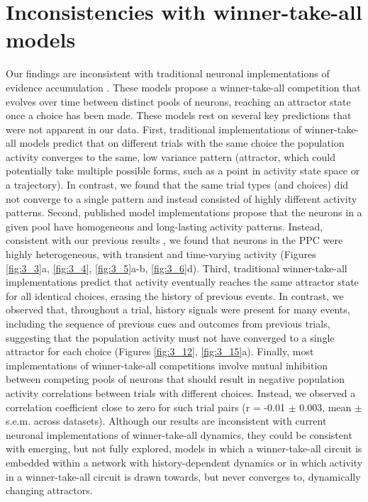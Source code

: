 \section{Inconsistencies with winner-take-all models} \label{discussion:wta}

Our findings are inconsistent with traditional neuronal implementations of evidence accumulation \citep{Wong:2006in, Machens:2005en, Wang:2002kn}. These models propose a winner-take-all competition that evolves over time between distinct pools of neurons, reaching an attractor state once a choice has been made. These models rest on several key predictions that were not apparent in our data. First, traditional implementations of winner-take-all models predict that on different trials with the same choice the population activity converges to the same, low variance pattern (attractor, which could potentially take multiple possible forms, such as a point in activity state space or a trajectory). In contrast, we found that the same trial types (and choices) did not converge to a single pattern and instead consisted of highly different activity patterns. Second, published model implementations propose that the neurons in a given pool have homogeneous and long-lasting activity patterns. Instead, consistent with our previous results \citep{Harvey:2012du}, we found that neurons in the PPC were highly heterogeneous, with transient and time-varying activity (Figures \ref{fig:3_3}a, \ref{fig:3_4}, \ref{fig:3_5}a-b, \ref{fig:3_6}d). Third, traditional winner-take-all implementations predict that activity eventually reaches the same attractor state for all identical choices, erasing the history of previous events. In contrast, we observed that, throughout a trial, history signals were present for many events, including the sequence of previous cues and outcomes from previous trials, suggesting that the population activity must not have converged to a single attractor for each choice (Figures \ref{fig:3_12}, \ref{fig:3_15}a). Finally, most implementations of winner-take-all competitions involve mutual inhibition between competing pools of neurons that should result in negative population activity correlations between trials with different choices. Instead, we observed a correlation coefficient close to zero for such trial pairs (r = -0.01 $\pm$ 0.003, mean $\pm$ s.e.m. across datasets). Although our results are inconsistent with current neuronal implementations of winner-take-all dynamics, they could be consistent with emerging, but not fully explored, models in which a winner-take-all circuit is embedded within a network with history-dependent dynamics \citep{Klampfl:2013gq} or in which activity in a winner-take-all circuit is drawn towards, but never converges to, dynamically changing attractors.

